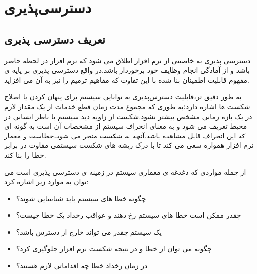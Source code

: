\chapter{دسترسی‌پذیری}
\section{تعریف دسترسی پذیری}
دسترسی پذیری به خاصیتی از نرم افزار اطلاق می شود که نرم افزار در لحظه حاضر باشد و از آمادگی انجام وظایف خود برخوردار باشد.در واقع دسترسی پذیری بر پایه ی مفهوم قابلیت اطمینان بنا شده با این تفاوت که مفاهیم ترمیم  را نیز به آن می افزاید.

به طور دقیق تر،‌قابلیت دسترس‌پذیری به توانایی سیستم برای پنهان کردن یا اصلاح شکست ها اشاره دارد؛‌به طوری که مجموع مدت زمان قطع خدمات از یک مقدار لازم در یک بازه زمانی مشخص بیشتر نشود.شکست از زاویه دید سیستم یا ناظر انسانی در محیط تعریف می شود و به معنای انحراف سیستم از مشخصات آن است به گونه ای که این انحراف قابل مشاهده باشد.آنچه به شکست منجر می شود،خطاست و معمار نرم افزار همواره سعی می کند تا با درک ریشه های شکست سیستمی مقاوت در برابر خطا را بنا کند.

از جمله مواردی که دغدغه ی معماری سیستم در زمینه ی دسترسی پذیری است می توان به موارد زیر اشاره کرد:
\begin{itemize}
\item
چگونه خطا های سیستم باید شناسایی شوند؟
\item
چقدر ممکن است خطا های سیستم رخ دهند و عواقب رخداد یک خطا چیست؟
\item
یک سیستم چقدر می تواند خارج از دسترس باشد؟
\item
چگونه می توان از خطا و در نتیجه شکست نرم افزار جلوگیری کرد؟
\item
در زمان رخداد خطا چه اقداماتی لازم هستند؟
\end{itemize}


